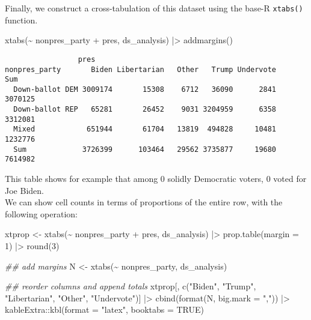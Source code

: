 \documentclass[fleqn,10pt]{wlscirep}
\newenvironment{Shaded}{\begin{snugshade}}{\end{snugshade}}
\newcommand{\AttributeTok}[1]{\textcolor[rgb]{0.40,0.45,0.13}{#1}}
\newcommand{\ConstantTok}[1]{\textcolor[rgb]{0.56,0.35,0.01}{#1}}
\newcommand{\DecValTok}[1]{\textcolor[rgb]{0.68,0.00,0.00}{#1}}
\newcommand{\DocumentationTok}[1]{\textcolor[rgb]{0.37,0.37,0.37}{\textit{#1}}}
\newcommand{\FunctionTok}[1]{\textcolor[rgb]{0.28,0.35,0.67}{#1}}
\newcommand{\NormalTok}[1]{\textcolor[rgb]{0.00,0.23,0.31}{#1}}
\newcommand{\OtherTok}[1]{\textcolor[rgb]{0.00,0.23,0.31}{#1}}
\newcommand{\SpecialCharTok}[1]{\textcolor[rgb]{0.37,0.37,0.37}{#1}}
\newcommand{\StringTok}[1]{\textcolor[rgb]{0.13,0.47,0.30}{#1}}
\begin{document}
\noindent Finally, we construct a cross-tabulation of this dataset using
the base-R \texttt{xtabs()} function.

\begin{Shaded}
\begin{Highlighting}[]
\FunctionTok{xtabs}\NormalTok{(}\SpecialCharTok{\textasciitilde{}}\NormalTok{ nonpres\_party }\SpecialCharTok{+}\NormalTok{ pres, ds\_analysis) }\SpecialCharTok{|\textgreater{}} 
  \FunctionTok{addmargins}\NormalTok{()}
\end{Highlighting}
\end{Shaded}

\begin{verbatim}
                 pres
nonpres_party       Biden Libertarian   Other   Trump Undervote     Sum
  Down-ballot DEM 3009174       15308    6712   36090      2841 3070125
  Down-ballot REP   65281       26452    9031 3204959      6358 3312081
  Mixed            651944       61704   13819  494828     10481 1232776
  Sum             3726399      103464   29562 3735877     19680 7614982
\end{verbatim}

This table shows for example that among 0 solidly Democratic voters, 0
voted for Joe Biden.\\
We can show cell counts in terms of proportions of the entire row, with
the following operation:

\begin{Shaded}
\begin{Highlighting}[]
\NormalTok{xtprop }\OtherTok{\textless{}{-}} \FunctionTok{xtabs}\NormalTok{(}\SpecialCharTok{\textasciitilde{}}\NormalTok{ nonpres\_party }\SpecialCharTok{+}\NormalTok{ pres, ds\_analysis) }\SpecialCharTok{|\textgreater{}} 
  \FunctionTok{prop.table}\NormalTok{(}\AttributeTok{margin =} \DecValTok{1}\NormalTok{) }\SpecialCharTok{|\textgreater{}} 
  \FunctionTok{round}\NormalTok{(}\DecValTok{3}\NormalTok{) }

\DocumentationTok{\#\# add margins}
\NormalTok{N }\OtherTok{\textless{}{-}} \FunctionTok{xtabs}\NormalTok{(}\SpecialCharTok{\textasciitilde{}}\NormalTok{ nonpres\_party, ds\_analysis)}

\DocumentationTok{\#\# reorder columns and append totals}
\NormalTok{xtprop[, }\FunctionTok{c}\NormalTok{(}\StringTok{"Biden"}\NormalTok{, }\StringTok{"Trump"}\NormalTok{, }\StringTok{"Libertarian"}\NormalTok{, }\StringTok{"Other"}\NormalTok{, }\StringTok{"Undervote"}\NormalTok{)] }\SpecialCharTok{|\textgreater{}} 
  \FunctionTok{cbind}\NormalTok{(}\FunctionTok{format}\NormalTok{(N, }\AttributeTok{big.mark =} \StringTok{","}\NormalTok{)) }\SpecialCharTok{|\textgreater{}} 
\NormalTok{  kableExtra}\SpecialCharTok{::}\FunctionTok{kbl}\NormalTok{(}\AttributeTok{format =} \StringTok{"latex"}\NormalTok{, }\AttributeTok{booktabs =} \ConstantTok{TRUE}\NormalTok{)}
\end{Highlighting}
\end{Shaded}
\end{document}
